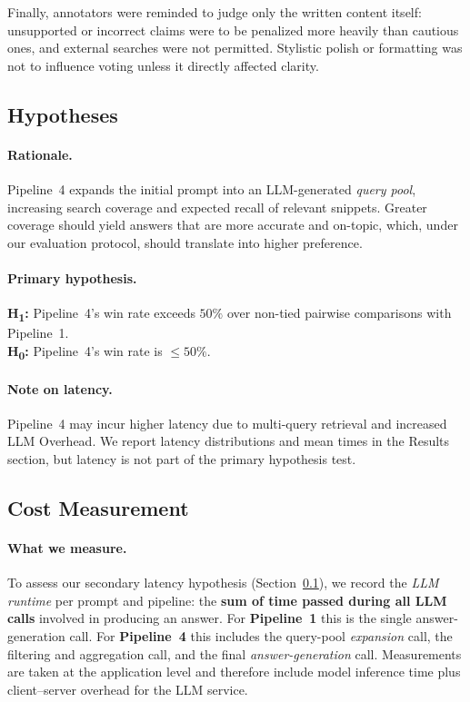 \documentclass[manuscript,screen]{acmart}
\begin{document}
\begin{CCSXML}
	Finally, annotators were reminded to judge only the written content itself:
	unsupported or incorrect claims were to be penalized more heavily than cautious
	ones, and external searches were not permitted. Stylistic polish or formatting
	was not to influence voting unless it directly affected clarity.

	
	\subsection{Hypotheses}
	\label{subsec:hypotheses}

	\paragraph{Rationale.}
	Pipeline~4 expands the initial prompt into an LLM-generated \emph{query pool}, increasing search coverage and expected recall of relevant snippets. Greater coverage should yield answers that are more accurate and on-topic, which, under our evaluation protocol, should translate into higher preference.
	
	\paragraph{Primary hypothesis.}
	\textbf{H\textsubscript{1}:} Pipeline~4’s win rate exceeds $50\%$ over non-tied pairwise comparisons with Pipeline~1.\\
	\textbf{H\textsubscript{0}:} Pipeline~4’s win rate is $\leq 50\%$.
	
	\paragraph{Note on latency.}
	Pipeline~4 may incur higher latency due to multi-query retrieval and increased LLM Overhead. We report latency distributions and mean times in the Results section, but latency is not part of the primary hypothesis test.


		
	\subsection{Cost Measurement}
	\label{subsec:cost-measure}

	\paragraph{What we measure.}
	To assess our secondary latency hypothesis (Section~\ref{subsec:hypotheses}), we record the
	\emph{LLM runtime} per prompt and pipeline: the \textbf{sum of time passed during all LLM
		calls} involved in producing an answer. For \textbf{Pipeline~1} this is the single
	answer-generation call. For \textbf{Pipeline~4} this includes the query-pool \emph{expansion}
	call, the filtering and aggregation call, and the final \emph{answer-generation} call. Measurements are taken at the application level and
	therefore include model inference time plus client–server overhead for the LLM service.
	

\end{CCSXML}
\end{document}
